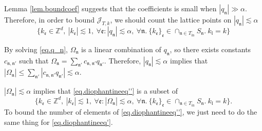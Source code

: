 Lemma \ref{lem.boundcoef} suggests that the coefficients is small when $|q_{\mathfrak{n}}|\gg \alpha$. Therefore, in order to bound $\mathcal{J}_{T,k}$, we should count the lattice points on $|q_{\mathfrak{n}}|\lesssim \alpha$
\begin{equation}\label{eq.diophantineeq''}
    \{k_{\mathfrak{e}}\in \mathbb{Z}^d,\ |k_{\mathfrak{e}}|\lesssim 1,\ \forall \mathfrak{e}: |q_{\mathfrak{n}}|\lesssim \alpha,\ \forall \mathfrak{n}. \ \{k_{\mathfrak{e}}\}_{\mathfrak{e}}\in \cap_{\mathfrak{n}\in T_{\text{in}}} S_{\mathfrak{n}}.\ k_{\mathfrak{l}}=k\}
\end{equation}

By solving \eqref{eq.q_n}, $\Omega_{\mathfrak{n}}$ is a linear combination of $q_{\mathfrak{n}}$, so there exists constants $c_{\mathfrak{n},\mathfrak{n}'}$ such that $\Omega_{\mathfrak{n}}=\sum_{\mathfrak{n}'}c_{\mathfrak{n},\mathfrak{n}'}q_{\mathfrak{n}'}$. Therefore, $|q_{\mathfrak{n}}|\lesssim \alpha$ implies that $|\Omega_{\mathfrak{n}}|\le\sum_{\mathfrak{n}'}|c_{\mathfrak{n},\mathfrak{n}'}q_{\mathfrak{n}'}|\lesssim \alpha$.

$|\Omega_{\mathfrak{n}}|\lesssim \alpha$ implies that \eqref{eq.diophantineeq''} is a subset of
\begin{equation}\label{eq.diophantineeq'}
    \{k_{\mathfrak{e}}\in \mathbb{Z}^d,\ |k_{\mathfrak{e}}|\lesssim 1,\ \forall \mathfrak{e}: |\Omega_{\mathfrak{n}}|\lesssim \alpha,\ \forall \mathfrak{n}. \ \{k_{\mathfrak{e}}\}_{\mathfrak{e}}\in \cap_{\mathfrak{n}\in T_{\text{in}}} S_{\mathfrak{n}}.\ k_{\mathfrak{l}}=k\}.
\end{equation}
To bound the number of elements of \eqref{eq.diophantineeq''}, we just need to do the same thing for \eqref{eq.diophantineeq'}.

